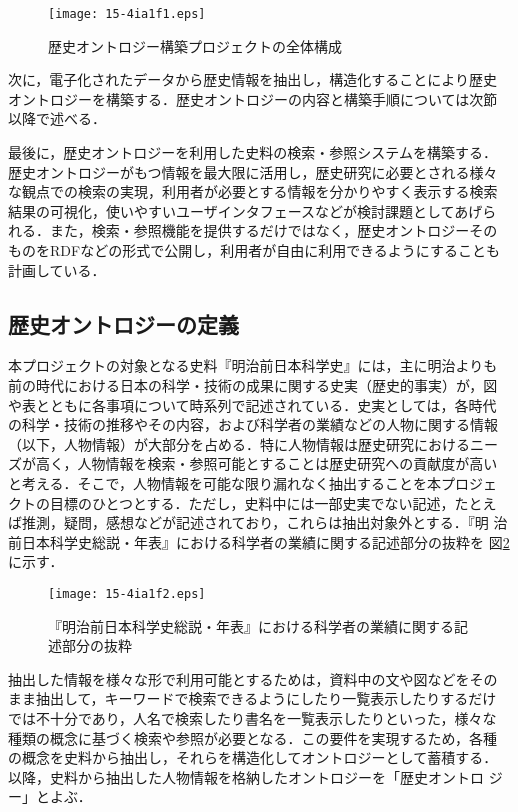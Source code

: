 \documentclass[japanese]{jnlp_1.4}
\begin{document}
\begin{figure}[t]
\begin{center}
\texttt{[image: 15-4ia1f1.eps]}
\caption{歴史オントロジー構築プロジェクトの全体構成}
\label{fig:arch}
\end{center}
\end{figure}

次に，電子化されたデータから歴史情報を抽出し，構造化することにより歴史
オントロジーを構築する．歴史オントロジーの内容と構築手順については次節
以降で述べる．

最後に，歴史オントロジーを利用した史料の検索・参照システムを構築する．
歴史オントロジーがもつ情報を最大限に活用し，歴史研究に必要とされる様々
な観点での検索の実現，利用者が必要とする情報を分かりやすく表示する検索
結果の可視化，使いやすいユーザインタフェースなどが検討課題としてあげら
れる．また，検索・参照機能を提供するだけではなく，歴史オントロジーその
ものをRDFなどの形式で公開し，利用者が自由に利用できるようにすることも
計画している．


\subsection{歴史オントロジーの定義}

本プロジェクトの対象となる史料『明治前日本科学史』には，主に明治よりも
前の時代における日本の科学・技術の成果に関する史実（歴史的事実）が，図
や表とともに各事項について時系列で記述されている．史実としては，各時代
の科学・技術の推移やその内容，および科学者の業績などの人物に関する情報
（以下，人物情報）が大部分を占める．特に人物情報は歴史研究におけるニー
ズが高く，人物情報を検索・参照可能とすることは歴史研究への貢献度が高い
と考える．そこで，人物情報を可能な限り漏れなく抽出することを本プロジェ
クトの目標のひとつとする．ただし，史料中には一部史実でない記述，たとえ
ば推測，疑問，感想などが記述されており，これらは抽出対象外とする．『明
治前日本科学史総説・年表』における科学者の業績に関する記述部分の抜粋を
図\ref{fig:desc}に示す．

\begin{figure}[t]
\begin{center}
\texttt{[image: 15-4ia1f2.eps]}
\caption{『明治前日本科学史総説・年表』における科学者の業績に関する記述部分の抜粋}
\label{fig:desc}
\end{center}
\end{figure}

抽出した情報を様々な形で利用可能とするためは，資料中の文や図などをその
まま抽出して，キーワードで検索できるようにしたり一覧表示したりするだけ
では不十分であり，人名で検索したり書名を一覧表示したりといった，様々な
種類の概念に基づく検索や参照が必要となる．この要件を実現するため，各種
の概念を史料から抽出し，それらを構造化してオントロジーとして蓄積する．
以降，史料から抽出した人物情報を格納したオントロジーを「歴史オントロ
ジー」とよぶ．
\end{document}
